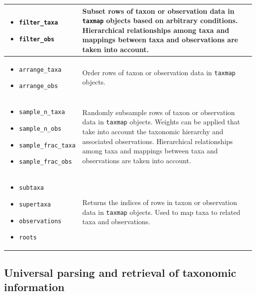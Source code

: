 \documentclass[10pt,letterpaper]{article}
\begin{document}
\begin{table}
\begin{tabular}[t]{p{4cm}  p{8.5cm}}
		\hline
		\begin{itemize}
			\setlength\itemsep{0em}
			\item \texttt{filter\_taxa}
			\item \texttt{filter\_obs}
		\end{itemize} & Subset rows of taxon or observation data in \texttt{taxmap} objects based on arbitrary conditions. Hierarchical relationships among taxa and mappings between taxa and observations are taken into account.  \\
		\hline
		\begin{itemize}
			\setlength\itemsep{0em}
			\item \texttt{arrange\_taxa}
			\item \texttt{arrange\_obs}
		\end{itemize} & Order rows of taxon or observation data in \texttt{taxmap} objects.  \\
		\hline
		\begin{itemize}
			\setlength\itemsep{0em}
			\item \texttt{sample\_n\_taxa}
			\item \texttt{sample\_n\_obs}
			\item \texttt{sample\_frac\_taxa}
			\item \texttt{sample\_frac\_obs}
		\end{itemize} & Randomly subsample rows of taxon or observation data in \texttt{taxmap} objects. Weights can be applied that take into account the taxonomic hierarchy and associated observations. Hierarchical relationships among taxa and mappings between taxa and observations are taken into account. \\
		\hline
		\begin{itemize}
			\setlength\itemsep{0em}
			\item \texttt{subtaxa}
			\item \texttt{supertaxa}
			\item \texttt{observations}
			\item \texttt{roots}
		\end{itemize} & Returns the indices of rows in taxon or observation data in \texttt{taxmap} objects. Used to map taxa to related taxa and observations.  \\
		\hline
	\end{tabular}
	\label{table1}

\end{table}


\subsection*{Universal parsing and retrieval of taxonomic
	information}\label{universal-parsing-and-retrieval-of-taxonomic-information}
\end{document}
